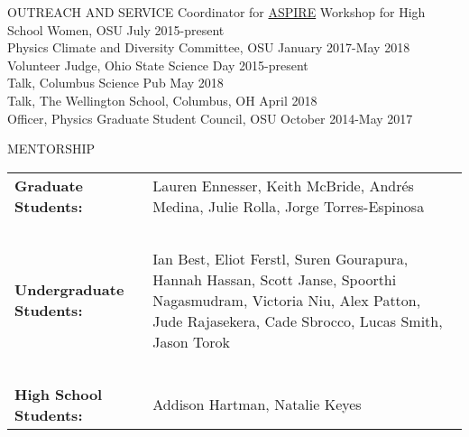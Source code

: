\documentclass{resume} %
\begin{document}
\begin{rSection}{OUTREACH AND SERVICE}
Coordinator for \href{u.osu.edu/aspire}{ASPIRE} Workshop for High School Women, OSU \hfill July 2015-present\\
Physics Climate and Diversity Committee, OSU \hfill January 2017-May 2018\\
Volunteer Judge, Ohio State Science Day \hfill 2015-present\\
Talk, Columbus Science Pub \hfill  May 2018\\
Talk, The Wellington School, Columbus, OH \hfill April 2018\\
Officer, Physics Graduate Student Council, OSU \hfill October 2014-May 2017 \\
\end{rSection}
\vspace{-0.30cm}

\begin{rSection}{MENTORSHIP}
\begin{table}[h]
\begin{tabularx}{\textwidth}{l X}
 {\bf Graduate Students:}  & Lauren Ennesser, Keith McBride, Andr\'es Medina, Julie Rolla,  \hspace{1cm} Jorge Torres-Espinosa \\
 ~ & ~ \\
{\bf Undergraduate Students:}  & Ian Best, Eliot Ferstl, Suren Gourapura, Hannah Hassan, Scott Janse, Spoorthi Nagasmudram, Victoria Niu, Alex Patton, Jude Rajasekera, Cade Sbrocco, Lucas Smith, Jason Torok \\
~ & ~ \\
{\bf High School Students:} &  Addison Hartman, Natalie Keyes\\
\end{tabularx}
\end{table}
\end{rSection}
\end{document}
